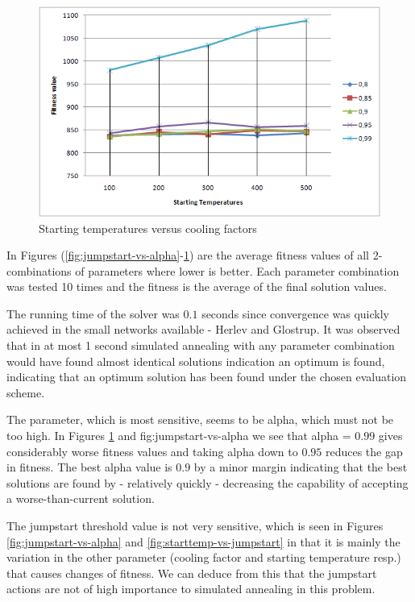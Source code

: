 \begin{figure}[ht]
\centering
\includegraphics[scale=0.3]{tuning_starttemp-vs-alpha.png}
\caption{Starting temperatures versus cooling factors}
\label{fig:starttemp-vs-alpha}
\end{figure}

In Figures (\ref{fig:jumpstart-vs-alpha}-\ref{fig:starttemp-vs-alpha}) are the average fitness values of all 2-combinations of parameters where lower is better. Each parameter combination was tested 10 times and the fitness is the average of the final solution values. 

The running time of the solver was $0.1$ seconds since convergence was quickly achieved in the small networks available - Herlev and Glostrup. It was observed that in at most 1 second simulated annealing with any parameter combination would have found almost identical solutions indication an optimum is found, indicating that an optimum solution has been found under the chosen evaluation scheme.

The parameter, which is most sensitive, seems to be alpha, which must not be too high. In Figures \ref{fig:starttemp-vs-alpha} and {fig:jumpstart-vs-alpha} we see that alpha = $0.99$ gives considerably worse fitness values and taking alpha down to $0.95$ reduces the gap in fitness. The best alpha value is $0.9$ by a minor margin indicating that the best solutions are found by - relatively quickly - decreasing the capability of accepting a worse-than-current solution.

The jumpstart threshold value is not very sensitive, which is seen in Figures \ref{fig:jumpstart-vs-alpha} and \ref{fig:starttemp-vs-jumpstart} in that it is mainly the variation in the other parameter (cooling factor and starting temperature resp.) that causes changes of fitness. We can deduce from this that the jumpstart actions are not of high importance to simulated annealing in this problem.

